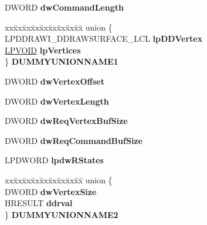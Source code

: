 \begin{DoxyCompactItemize}
D\+W\+O\+RD {\bfseries dw\+Command\+Length}
\item 
\mbox{\label{struct___d3_d_h_a_l___d_r_a_w_p_r_i_m_i_t_i_v_e_s2_d_a_t_a_a6395c5085b0342095eb08523dba09e36}} 
\begin{tabbing}
xx\=xx\=xx\=xx\=xx\=xx\=xx\=xx\=xx\=\kill
union \{\\
\>LPDDRAWI\_DDRAWSURFACE\_LCL {\bfseries lpDDVertex}\\
\>\hyperlink{interfacevoid}{LPVOID} {\bfseries lpVertices}\\
\} {\bfseries DUMMYUNIONNAME1}\\

\end{tabbing}\item 
\mbox{\label{struct___d3_d_h_a_l___d_r_a_w_p_r_i_m_i_t_i_v_e_s2_d_a_t_a_a22de069f6c08b1b069d999ad101c7140}} 
D\+W\+O\+RD {\bfseries dw\+Vertex\+Offset}
\item 
\mbox{\label{struct___d3_d_h_a_l___d_r_a_w_p_r_i_m_i_t_i_v_e_s2_d_a_t_a_a2ff1ef1e461ce29ee3f5327c0d5a7c3f}} 
D\+W\+O\+RD {\bfseries dw\+Vertex\+Length}
\item 
\mbox{\label{struct___d3_d_h_a_l___d_r_a_w_p_r_i_m_i_t_i_v_e_s2_d_a_t_a_a4d2c7d85fe338af72648916db8d4cfcb}} 
D\+W\+O\+RD {\bfseries dw\+Req\+Vertex\+Buf\+Size}
\item 
\mbox{\label{struct___d3_d_h_a_l___d_r_a_w_p_r_i_m_i_t_i_v_e_s2_d_a_t_a_ad775e23d762687f679781759262f7ec7}} 
D\+W\+O\+RD {\bfseries dw\+Req\+Command\+Buf\+Size}
\item 
\mbox{\label{struct___d3_d_h_a_l___d_r_a_w_p_r_i_m_i_t_i_v_e_s2_d_a_t_a_aeb215894d6152232b9c77c0c69b93b20}} 
L\+P\+D\+W\+O\+RD {\bfseries lpdw\+R\+States}
\item 
\mbox{\label{struct___d3_d_h_a_l___d_r_a_w_p_r_i_m_i_t_i_v_e_s2_d_a_t_a_aaa2292b117825051981cfeb2c1f40f85}} 
\begin{tabbing}
xx\=xx\=xx\=xx\=xx\=xx\=xx\=xx\=xx\=\kill
union \{\\
\>DWORD {\bfseries dwVertexSize}\\
\>HRESULT {\bfseries ddrval}\\
\} {\bfseries DUMMYUNIONNAME2}\\


\end{tabbing}
\end{DoxyCompactItemize}
